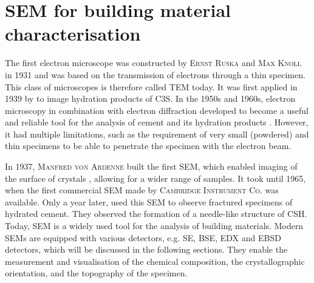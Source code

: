 
\FloatBarrier
\section[Scanning electron microscopy for building material characterisation]{\Acl*{SEM} for building material characterisation}

The first electron microscope was constructed by \textsc{Ernst Ruska} and \textsc{Max Knoll} in 1931 \cite{knoll.1932} and was based on the transmission of electrons through a thin specimen.
This class of microscopes is therefore called \acs{TEM} today.
It was first applied in 1939 by \textcite{rapczewski.1939} to image hydration products of \ac{C3S}.
In the 1950s and 1960s, electron microscopy in combination with electron diffraction developed to become a useful and reliable tool for the analysis of cement and its hydration products \cite{grudemo.1960, grudemo.1965}.
However, it had multiple limitations, such as the requirement of very small (powdered) and thin specimens to be able to penetrate the specimen with the electron beam.

In 1937, \textsc{Manfred von Ardenne} built the first \ac{SEM}, which enabled imaging of the surface of  crystals \cite{vonardenne.1938}, allowing for a wider range of samples.
It took until 1965, when the first commercial \ac{SEM} made by \textsc{Cambridge Instrument Co.} was available.
Only a year later, \textcite{chatterji.1966} used this \ac{SEM} to observe fractured specimens of hydrated cement.
They observed the formation of a needle-like structure of \ac{CSH}.
Today, \ac{SEM} is a widely used tool for the analysis of building materials.
Modern \ac{SEM}s are equipped with various detectors, e.g. \ac{SE}, \ac{BSE}, \ac{EDX} and \ac{EBSD} detectors, which will be discussed in the following sections.
They enable the measurement and visualisation of the chemical composition, the crystallographic orientation, and the topography of the specimen.









